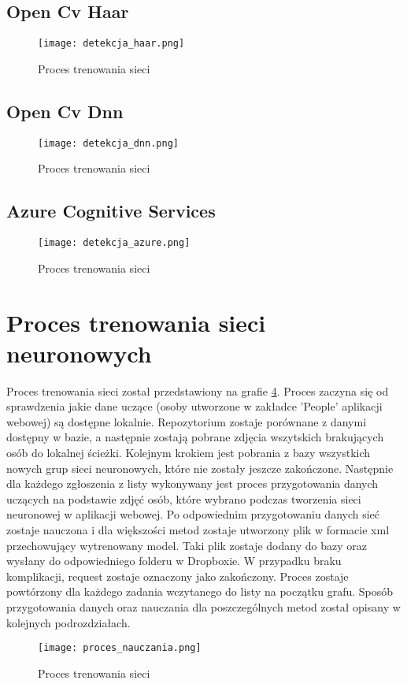 \subsection{Open Cv Haar}
\begin{figure}[H]
	\centering
	\texttt{[image: detekcja\_haar.png]}
	\caption{Proces trenowania sieci}
	\label{fig:trenowanie_proces}
\end{figure}

\subsection{Open Cv Dnn}
\begin{figure}[H]
	\centering
	\texttt{[image: detekcja\_dnn.png]}
	\caption{Proces trenowania sieci}
	\label{fig:trenowanie_proces}
\end{figure}

\subsection{Azure Cognitive Services}
\begin{figure}[H]
	\centering
	\texttt{[image: detekcja\_azure.png]}
	\caption{Proces trenowania sieci}
	\label{fig:trenowanie_proces}
\end{figure}


\section{Proces trenowania sieci neuronowych}
Proces trenowania sieci został przedstawiony na grafie \ref{fig:trenowanie_proces}. Proces zaczyna się od sprawdzenia jakie dane uczące (osoby utworzone w zakładce 'People' aplikacji webowej) są dostępne lokalnie. Repozytorium zostaje porównane z danymi dostępny w bazie, a następnie zostają pobrane zdjęcia wszytskich brakujących osób do lokalnej ścieżki. Kolejnym krokiem jest pobrania z bazy wszystkich nowych grup sieci neuronowych, które nie zostały jeszcze zakończone. Następnie dla każdego zgłoszenia z listy wykonywany jest proces przygotowania danych uczących na podstawie zdjęć osób, które wybrano podczas tworzenia sieci neuronowej w aplikacji webowej. Po odpowiednim przygotowaniu danych sieć zostaje nauczona i dla większości metod zostaje utworzony plik w formacie xml przechowujący wytrenowany model. Taki plik zostaje dodany do bazy oraz wysłany do odpowiedniego folderu w Dropboxie. W przypadku braku komplikacji, request zostaje oznaczony jako zakończony. Proces zostaje powtórzony dla każdego zadania wczytanego do listy na początku grafu. Sposób przygotowania danych oraz nauczania dla poszczególnych metod został opisany w kolejnych podrozdziałach.
\begin{figure}[H]
	\centering
	\texttt{[image: proces\_nauczania.png]}
	\caption{Proces trenowania sieci}
	\label{fig:trenowanie_proces}
\end{figure}

